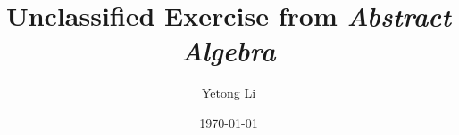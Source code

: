 \documentclass{article}
\begin{document}
\title{Unclassified Exercise from \it{Abstract Algebra}}
\author{Yetong Li}
\date{\today}
\maketitle
\end{document}
